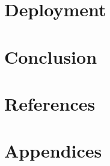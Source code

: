 \documentclass[11pt]{book}
\begin{document}
    \chapter{Deployment}\label{sec:deployment}
    

    \chapter{Conclusion}\label{sec:conclusion}

    \chapter{References}\label{sec:bibliography}
    
    

    \chapter{Appendices}\label{sec:appendices}
\end{document}
